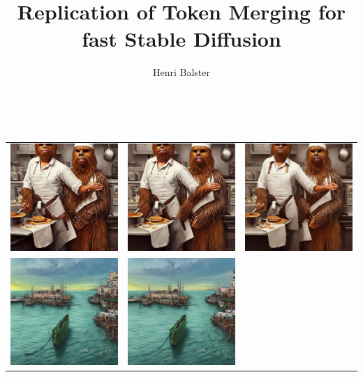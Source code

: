 \documentclass[12pt,a4paper]{article}
\title{Replication of Token Merging for fast Stable Diffusion}
\author{Henri Balster}
\date{}
\begin{document}

\newpage
\tableofcontents
\onehalfspacing
\newpage
{}


\\
\begin{table}[!htb]
\centering
\begin{tabular}{c c c}
    \includegraphics[width=0.3\linewidth]{static/sample_imgs/main/wookie_0.png} & 
    \includegraphics[width=0.3\linewidth]{static/sample_imgs/main/wookie_20.png} &
    \includegraphics[width=0.3\linewidth]{static/sample_imgs/main/wookie_50.png}\\
    \includegraphics[width=0.3\linewidth]{static/sample_imgs/main/boat_0.png} & 
    \includegraphics[width=0.3\linewidth]{static/sample_imgs/main/boat_20.png} &

\end{tabular}
\end{table}
\end{document}
